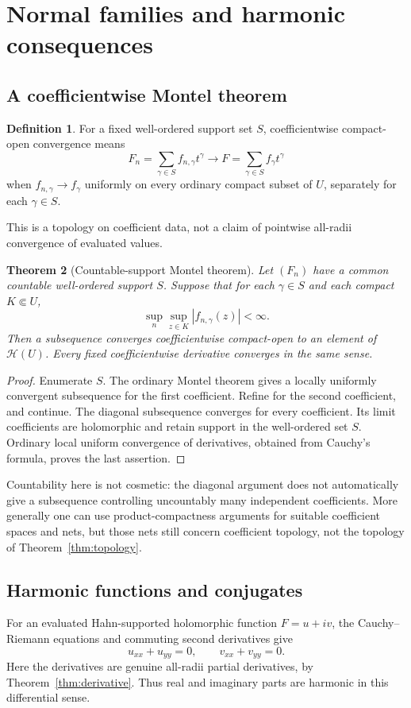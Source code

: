 \documentclass[11pt,oneside]{article}
\newtheorem{theorem}{Theorem}[section]
\theoremstyle{definition}\newtheorem{definition}[theorem]{Definition}
\newcommand{\HH}{\mathcal H}
\begin{document}
\section{Normal families and harmonic consequences}\label{sec:normal}
\subsection{A coefficientwise Montel theorem}
\begin{definition}
For a fixed well-ordered support set $S$, coefficientwise compact-open convergence means
\[
 F_n=\sum_{\gamma\in S}f_{n,\gamma}t^\gamma\longrightarrow
 F=\sum_{\gamma\in S}f_\gamma t^\gamma
\]
when $f_{n,\gamma}\to f_\gamma$ uniformly on every ordinary compact subset of $U$, separately for each $\gamma\in S$.
\end{definition}
This is a topology on coefficient data, not a claim of pointwise all-radii convergence of evaluated values.

\begin{theorem}[Countable-support Montel theorem]\label{thm:montel}
Let $(F_n)$ have a common countable well-ordered support $S$. Suppose that for each $\gamma\in S$ and each compact $K\Subset U$,
\[
 \sup_n\sup_{z\in K}|f_{n,\gamma}(z)|<\infty.
\]
Then a subsequence converges coefficientwise compact-open to an element of $\HH(U)$. Every fixed coefficientwise derivative converges in the same sense.
\end{theorem}
\begin{proof}
Enumerate $S$. The ordinary Montel theorem gives a locally uniformly convergent subsequence for the first coefficient. Refine for the second coefficient, and continue. The diagonal subsequence converges for every coefficient. Its limit coefficients are holomorphic and retain support in the well-ordered set $S$. Ordinary local uniform convergence of derivatives, obtained from Cauchy's formula, proves the last assertion.
\end{proof}
Countability here is not cosmetic: the diagonal argument does not automatically give a subsequence controlling uncountably many independent coefficients. More generally one can use product-compactness arguments for suitable coefficient spaces and nets, but those nets still concern coefficient topology, not the topology of Theorem~\ref{thm:topology}.

\subsection{Harmonic functions and conjugates}
For an evaluated Hahn-supported holomorphic function $F=u+iv$, the Cauchy--Riemann equations and commuting second derivatives give
\[
 u_{xx}+u_{yy}=0,\qquad v_{xx}+v_{yy}=0.
\]
Here the derivatives are genuine all-radii partial derivatives, by Theorem~\ref{thm:derivative}. Thus real and imaginary parts are harmonic in this differential sense.
\end{document}
